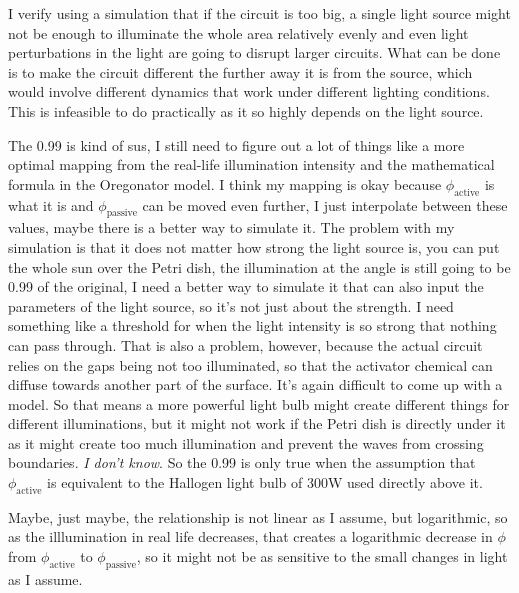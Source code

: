 I verify using a simulation that if the circuit is too big, a single light source might not be enough to illuminate the whole area relatively evenly and even light perturbations in the light are going to disrupt larger circuits. 
What can be done is to make the circuit different the further away it is from the source, which would involve different dynamics that work under different lighting conditions. This is infeasible to do practically as it so highly depends on the light source. 

The 0.99 is kind of sus, I still need to figure out a lot of things like a more optimal mapping from the real-life illumination intensity and the mathematical formula in the Oregonator model. I think my mapping is okay because $\phi_{\text{active}}$ is what it is and $\phi_{\text{passive}}$ can be moved even further, I just interpolate between these values, maybe there is a better way to simulate it. The problem with my simulation is that it does not matter how strong the light source is, you can put the whole sun over the Petri dish, the illumination at the angle is still going to be 0.99 of the original, I need a better way to simulate it that can also input the parameters of the light source, so it's not just about the strength. I need something like a threshold for when the light intensity is so strong that nothing can pass through. That is also a problem, however, because the actual circuit relies on the gaps being not too illuminated, so that the activator chemical can diffuse towards another part of the surface. It's again difficult to come up with a model. 
So that means a more powerful light bulb might create different things for different illuminations, but it might not work if the Petri dish is directly under it as it might create too much illumination and prevent the waves from crossing boundaries. \textit{I don't know}. So the 0.99 is only true when the assumption that $\phi_{\text{active}}$ is equivalent to the Hallogen light bulb of 300W used directly above it.

Maybe, just maybe, the relationship is not linear as I assume, but logarithmic, so as the illlumination in real life decreases, that creates a logarithmic decrease in $\phi$ from $\phi_{\text{active}}$ to $\phi_{\text{passive}}$, so it might not be as sensitive to the small changes in light as I assume. 

